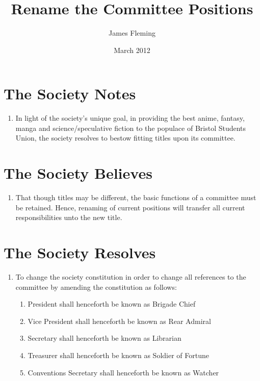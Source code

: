 \documentclass[a4paper,10pt]{article}
\title{Rename the Committee Positions}
\author{James Fleming}
\date{March 2012}
\begin{document}
\maketitle

\section*{The Society Notes}
\begin{enumerate}
  \item In light of the society’s unique goal, in providing the best anime, fantasy, manga and science/speculative fiction to the populace of Bristol Students Union, the society resolves to bestow fitting titles upon its committee.
\end{enumerate}

\section*{The Society Believes}
\begin{enumerate}
  \item That though titles may be different, the basic functions of a committee must be retained. Hence, renaming of current positions will transfer all current responsibilities unto the new title.
\end{enumerate}

\section*{The Society Resolves}
\begin{enumerate}
  \item To change the society constitution in order to change all references to the committee by amending the constitution as follows:
  \begin{enumerate}
    \item President shall henceforth be known as Brigade Chief
    \item Vice President shall henceforth be known as Rear Admiral
    \item Secretary shall henceforth be known as Librarian
    \item Treasurer shall henceforth be known as Soldier of Fortune
    \item Conventions Secretary shall henceforth be known as Watcher
  \end{enumerate}
\end{enumerate}
\end{document}

